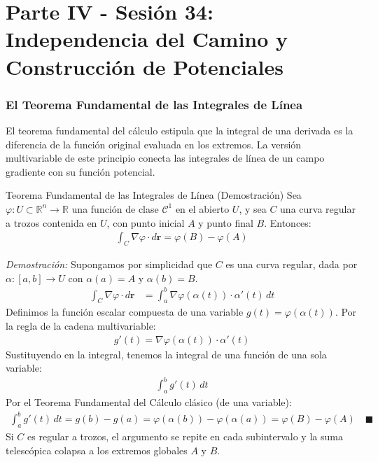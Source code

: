 \documentclass[11pt,a4paper]{article}
\begin{document}
\part*{Parte IV - Sesión 34: Independencia del Camino y Construcción de Potenciales}

\section{El Teorema Fundamental de las Integrales de Línea}

El teorema fundamental del cálculo estipula que la integral de una derivada es la diferencia de la función original evaluada en los extremos. La versión multivariable de este principio conecta las integrales de línea de un campo gradiente con su función potencial.

\begin{teoremabox}{Teorema Fundamental de las Integrales de Línea (Demostración)}
Sea $\varphi: U \subset \mathbb{R}^n \to \mathbb{R}$ una función de clase $\mathcal{C}^1$ en el abierto $U$, y sea $C$ una curva regular a trozos contenida en $U$, con punto inicial $A$ y punto final $B$. Entonces:
\begin{align*}
\int_C \nabla\varphi \cdot d\mathbf{r} = \varphi(B) - \varphi(A)
\end{align*}

\textit{Demostración:}
Supongamos por simplicidad que $C$ es una curva regular, dada por $\alpha: [a,b] \to U$ con $\alpha(a) = A$ y $\alpha(b) = B$.
\begin{align*}
\int_C \nabla\varphi \cdot d\mathbf{r} &= \int_a^b \nabla\varphi(\alpha(t)) \cdot \alpha'(t) \, dt
\end{align*}
Definimos la función escalar compuesta de una variable $g(t) = \varphi(\alpha(t))$. Por la regla de la cadena multivariable:
\begin{align*}
g'(t) = \nabla\varphi(\alpha(t)) \cdot \alpha'(t)
\end{align*}
Sustituyendo en la integral, tenemos la integral de una función de una sola variable:
\begin{align*}
\int_a^b g'(t) \, dt
\end{align*}
Por el Teorema Fundamental del Cálculo clásico (de una variable):
\begin{align*}
\int_a^b g'(t) \, dt = g(b) - g(a) = \varphi(\alpha(b)) - \varphi(\alpha(a)) = \varphi(B) - \varphi(A) \quad \blacksquare
\end{align*}
Si $C$ es regular a trozos, el argumento se repite en cada subintervalo y la suma telescópica colapsa a los extremos globales $A$ y $B$.
\end{teoremabox}
\end{document}
